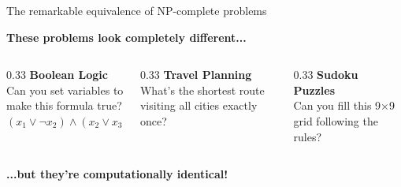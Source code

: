 \documentclass[aspectratio=169, lualatex, handout]{beamer}
\begin{document}
\begin{frame}{The remarkable equivalence of NP-complete problems}
	\begin{center}
		\Large\textbf{These problems look completely different...}
		\vspace{0.5cm}

		\begin{columns}[c]
			\begin{column}{0.33\textwidth}
				\textbf{Boolean Logic}\\
				\small Can you set variables to make this formula true?\\
				$(x_1 \lor \neg x_2) \land (x_2 \lor x_3) \land \ldots$
			\end{column}
			\begin{column}{0.33\textwidth}
				\textbf{Travel Planning}\\
				\small What's the shortest route visiting all cities exactly once?
			\end{column}
			\begin{column}{0.33\textwidth}
				\textbf{Sudoku Puzzles}\\
				\small Can you fill this 9×9 grid following the rules?
			\end{column}
		\end{columns}
		\vspace{0.5cm}

		\Large\textbf{...but they're computationally identical!}
	\end{center}
\end{frame}
\end{document}

